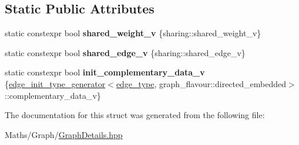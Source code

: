 \subsection*{Static Public Attributes}
\begin{DoxyCompactItemize}
\item 
\mbox{\label{structsequoia_1_1maths_1_1graph__impl_1_1edge__type__generator_3_01graph__flavour_1_1directed__ea342cc8fe32300e214551ee23d8584b1_a8d184c0cfd1f83314118c9cea4f95372}} 
static constexpr bool {\bfseries shared\+\_\+weight\+\_\+v} \{sharing\+::shared\+\_\+weight\+\_\+v\}
\item 
\mbox{\label{structsequoia_1_1maths_1_1graph__impl_1_1edge__type__generator_3_01graph__flavour_1_1directed__ea342cc8fe32300e214551ee23d8584b1_a5ed2958101045287ae7cfea96bd898ac}} 
static constexpr bool {\bfseries shared\+\_\+edge\+\_\+v} \{sharing\+::shared\+\_\+edge\+\_\+v\}
\item 
\mbox{\label{structsequoia_1_1maths_1_1graph__impl_1_1edge__type__generator_3_01graph__flavour_1_1directed__ea342cc8fe32300e214551ee23d8584b1_a18a9696b0df0c848ea429f41006f6ef9}} 
static constexpr bool {\bfseries init\+\_\+complementary\+\_\+data\+\_\+v} \{\mbox{\hyperlink{structsequoia_1_1maths_1_1graph__impl_1_1edge__init__type__generator}{edge\+\_\+init\+\_\+type\+\_\+generator}}$<$\mbox{\hyperlink{classsequoia_1_1maths_1_1edge}{edge\+\_\+type}}, graph\+\_\+flavour\+::directed\+\_\+embedded$>$\+::complementary\+\_\+data\+\_\+v\}
\end{DoxyCompactItemize}


The documentation for this struct was generated from the following file\+:\begin{DoxyCompactItemize}
\item 
Maths/\+Graph/\mbox{\hyperlink{_graph_details_8hpp}{Graph\+Details.\+hpp}}\end{DoxyCompactItemize}
